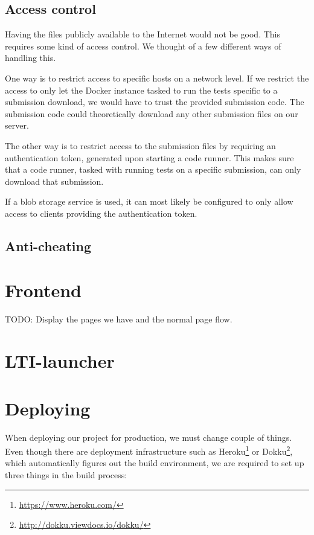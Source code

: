 \subsection*{Access control}

Having the files publicly available to the Internet would not be good. This requires some kind of access control. We thought of a few different ways of handling this.

One way is to restrict access to specific hosts on a network level. If we restrict the access to only let the Docker instance tasked to run the tests specific to a submission download, we would have to trust the provided submission code. The submission code could theoretically download any other submission files on our server.

The other way is to restrict access to the submission files by requiring an authentication token, generated upon starting a code runner. This makes sure that a code runner, tasked with running tests on a specific submission, can only download that submission.

If a blob storage service is used, it can most likely be configured to only allow access to clients providing the authentication token.

\subsection{Anti-cheating}

\section{Frontend}

TODO: Display the pages we have and the normal page flow.

\section{LTI-launcher}

\section{Deploying}

When deploying our project for production, we must change couple of things. Even though there are deployment infrastructure such as Heroku\footnote{\url{https://www.heroku.com/}} or Dokku\footnote{\url{http://dokku.viewdocs.io/dokku/}}, which automatically figures out the build environment, we are required to set up three things in the build process:

